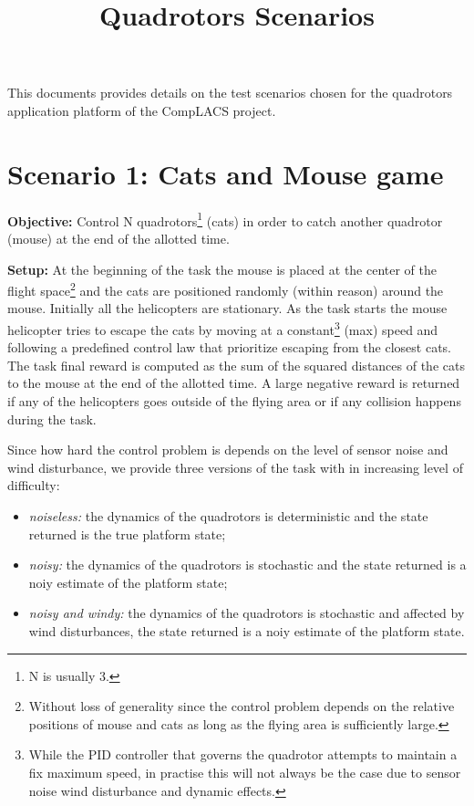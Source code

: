 \documentclass[a4paper,11pt]{article}
\title{Quadrotors Scenarios}
\author{}
\date{}
\begin{document}
\maketitle
This documents provides details on the test scenarios chosen for the quadrotors application platform of the CompLACS project. 

\section{Scenario 1: Cats and Mouse game}

\textbf{Objective:} Control N quadrotors\footnote{N is usually 3.} (cats) in order to catch another quadrotor (mouse) at the end of the allotted time.

\textbf{Setup:} At the beginning of the task the mouse is placed at the center of the flight space\footnote{Without loss of generality since the control problem depends on the relative positions of mouse and cats as long as the flying area is sufficiently large.} and the cats are positioned randomly (within reason) around the mouse. 
Initially all the helicopters are stationary. As the task starts the mouse helicopter tries to escape the cats by moving at a constant\footnote{While the PID controller that governs the quadrotor attempts to maintain a fix maximum speed, in practise this will not always be the case due to sensor noise wind disturbance and dynamic effects.} (max) speed and following a predefined control law that prioritize escaping from the closest cats. 
The task final reward is computed as the sum of the squared distances of the cats to the mouse at the end of the allotted time. 
A large negative reward is returned if any of the helicopters goes outside of the flying area or if any collision happens during the task.

Since how hard the control problem is depends on the level of sensor noise and wind disturbance, we provide three versions of the task with in increasing level of difficulty:
\begin{itemize}
 \item \textit{noiseless:} the dynamics of the quadrotors is deterministic and the state returned is the true platform state;
 \item \textit{noisy:} the dynamics of the quadrotors is stochastic and the state returned is a noiy estimate of the platform state;
 \item \textit{noisy and windy:} the dynamics of the quadrotors is stochastic and affected by wind disturbances, the state returned is a noiy estimate of the platform state.
\end{itemize}
\end{document}
